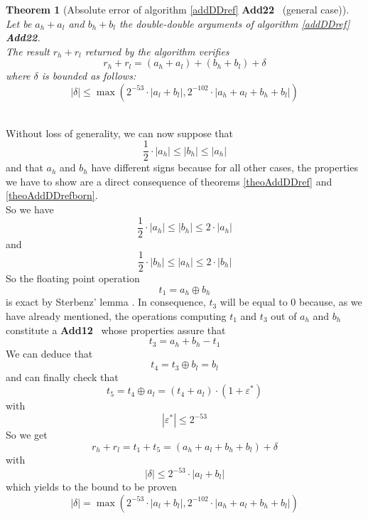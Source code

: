 \documentclass[a4paper,10pt,twoside]{article}
\newtheorem{theorem}{Theorem}[section]
\newenvironment{proof}[1][Proof]{\begin{trivlist}
\item[\hskip \labelsep {\bfseries #1}]}{\end{trivlist}}
\newcommand{\qed}{\nobreak \ifvmode \relax \else \ifdim \lastskip<1.5em \hskip-\lastskip
\hskip1.5em plus0em minus0.5em \fi \nobreak \vrule height0.75em width0.5em depth0.25em\fi}
\newcommand{\hi}{\ensuremath{\mathit{h}}}
\newcommand{\lo}{\ensuremath{\mathit{l}}}
\newcommand{\Add}{{\bf Add12}}
\newcommand{\AddDD}{{\bf Add22}}
\renewcommand{\epsilon}{\varepsilon}
\begin{document}
\begin{theorem}[Absolute error of algorithm \ref{addDDref} \AddDD~
    (general case)\label{addDDerrabs}] ~ \\
Let be $a_\hi + a_\lo$ and $b_\hi + b_\lo$ the double-double arguments of algorithm \ref{addDDref} \AddDD.\\
The result $r_\hi + r_\lo$ returned by the algorithm verifies
$$r_\hi + r_\lo = \left(a_\hi + a_\lo \right) + \left( b_\hi + b_\lo \right) + \delta$$
where $\delta$ is bounded as follows:
$$\left \vert \delta \right \vert \leq \max\left( 2^{-53} \cdot \left \vert a_\lo + b_\lo \right \vert,
                                                  2^{-102} \cdot \left \vert a_\hi + a_\lo + b_\hi + b_\lo \right \vert \right)$$
\end{theorem}
\begin{proof} ~ \\
Without loss of generality, we can now suppose that
$$\frac{1}{2} \cdot \left \vert a_\hi \right \vert \leq \left \vert b_\hi \right \vert \leq \left \vert a_\hi \right \vert$$
and that $a_\hi$ and $b_\hi$ have different signs
because for all other cases, the properties we have to show are a direct
consequence of theorems \ref{theoAddDDref} and \ref{theoAddDDrefborn}.\\
So we have
$$\frac{1}{2} \cdot \left \vert a_\hi \right \vert \leq \left \vert b_\hi \right \vert \leq 2 \cdot \left \vert a_\hi \right \vert$$
and
$$\frac{1}{2} \cdot \left \vert b_\hi \right \vert \leq \left \vert a_\hi \right \vert \leq 2 \cdot \left \vert b_\hi \right \vert$$
So the floating point operation
$$t_1 = a_\hi \oplus b_\hi$$
is exact by Sterbenz' lemma \cite{Ste74}.
In consequence, $t_3$ will be equal to $0$ because, as we have already
mentioned, the operations computing $t_1$ and $t_3$ out of $a_\hi$ and $b_\hi$
constitute a \Add~ whose properties assure that
$$t_3 = a_\hi + b_\hi - t_1$$
We can deduce that
$$t_4 = t_3 \oplus b_\lo = b_\lo$$
and can finally check that
$$t_5 = t_4 \oplus a_\lo = \left( t_4 + a_\lo \right) \cdot \left( 1 + \epsilon^* \right)$$
with
$$\left \vert \epsilon^* \right \vert \leq 2^{-53}$$
So we get
$$r_\hi + r_\lo = t_1 + t_5 = \left( a_\hi + a_\lo + b_\hi + b_\lo \right) + \delta$$
with
$$\left \vert \delta \right \vert \leq 2^{-53} \cdot \left \vert a_\lo + b_\lo \right \vert$$
which yields to the bound to be proven
$$\left \vert \delta \right \vert = \max\left( 2^{-53} \cdot \left \vert a_\lo + b_\lo \right \vert,
                                               2^{-102} \cdot \left \vert a_\hi + a_\lo + b_\hi + b_\lo \right \vert \right)$$ \qed
\end{proof}
\end{document}
